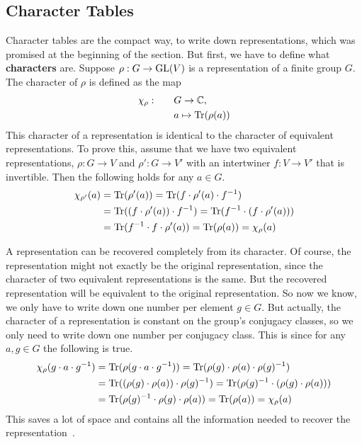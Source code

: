 \subsection{Character Tables}
\label{sec:reprep.char}

Character tables are the compact way, to write down representations, which was promised at the beginning of the section.
But first, we have to define what \textbf{characters} are.
Suppose $\rho: G \to \operatorname{GL}(V)$ is a representation of a finite group $G$.
The character of $\rho$ is defined as the map
\begin{subequations}
    \begin{align}
        \chi_\rho: \qquad & G \to \mathbb{C}, \\
        & a \mapsto \operatorname{Tr}(\rho(a))
    \end{align}
\end{subequations}
This character of a representation is identical to the character of equivalent representations.
To prove this, assume that we have two equivalent representations, $\rho: G \to V$ and $\rho': G \to V'$ with an intertwiner $f: V \to V'$ that is invertible.
Then the following holds for any $a \in G$.
\begin{subequations}
\begin{align}
    \chi_{\rho'}(a) & = \operatorname{Tr}(\rho'(a)) = \operatorname{Tr}(f \cdot \rho'(a) \cdot f^{-1}) \\
    & = \operatorname{Tr}((f \cdot \rho'(a)) \cdot f^{-1}) = \operatorname{Tr}(f^{-1} \cdot (f \cdot \rho'(a))) \\
    & = \operatorname{Tr}(f^{-1} \cdot f \cdot \rho'(a) )= \operatorname{Tr}(\rho(a)) = \chi_\rho(a)
\end{align}
\end{subequations}

A representation can be recovered completely from its character.
Of course, the representation might not exactly be the original representation, since the character of two equivalent representations is the same.
But the recovered representation will be equivalent to the original representation.
So now we know, we only have to write down one number per element $g \in G$.
But actually, the character of a representation is constant on the group's conjugacy classes, so we only need to write down one number per conjugacy class.
This is since for any $a, g \in G$ the following is true.
\begin{subequations}
\begin{align}
    \chi_\rho(g \cdot a \cdot g^{-1}) & = \operatorname{Tr}(\rho(g \cdot a \cdot g^{-1})) = \operatorname{Tr}(\rho(g) \cdot \rho(a) \cdot \rho(g)^{-1}) \\
    & = \operatorname{Tr}((\rho(g) \cdot \rho(a)) \cdot \rho(g)^{-1}) = \operatorname{Tr}(\rho(g)^{-1} \cdot (\rho(g) \cdot \rho(a))) \\
    & = \operatorname{Tr}(\rho(g)^{-1} \cdot \rho(g) \cdot \rho(a)) = \operatorname{Tr}(\rho(a)) = \chi_\rho(a) \\
\end{align}
\end{subequations}
This saves a lot of space and contains all the information needed to recover the representation~\cite{fulton2013}.

